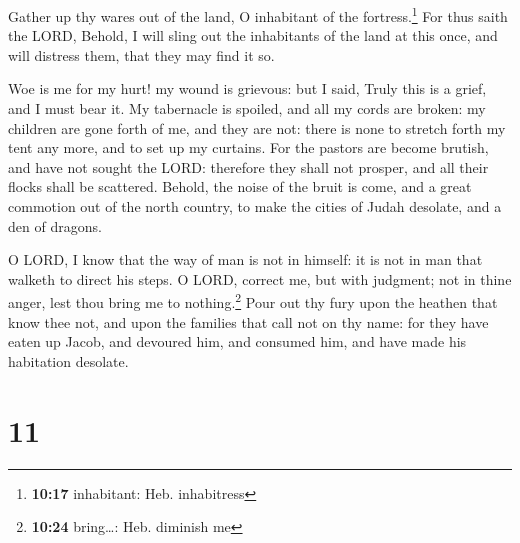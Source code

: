  Gather up thy wares out of the land, O inhabitant of the
fortress.\footnote{\textbf{10:17} inhabitant: Heb. inhabitress}
 For thus saith the LORD, Behold, I will sling out the
inhabitants of the land at this once, and will distress them, that they
may find it so.

 Woe is me for my hurt! my wound is grievous: but I said,
Truly this is a grief, and I must bear it.  My tabernacle
is spoiled, and all my cords are broken: my children are gone forth of
me, and they are not: there is none to stretch forth my tent any more,
and to set up my curtains.  For the pastors are become
brutish, and have not sought the LORD: therefore they shall not prosper,
and all their flocks shall be scattered.  Behold, the
noise of the bruit is come, and a great commotion out of the north
country, to make the cities of Judah desolate, and a den of dragons.

 O LORD, I know that the way of man is not in himself: it
is not in man that walketh to direct his steps.  O LORD,
correct me, but with judgment; not in thine anger, lest thou bring me to
nothing.\footnote{\textbf{10:24} bring\ldots: Heb. diminish me}
 Pour out thy fury upon the heathen that know thee not,
and upon the families that call not on thy name: for they have eaten up
Jacob, and devoured him, and consumed him, and have made his habitation
desolate.

\hypertarget{section-10}{%
\section{11}\label{section-10}}

